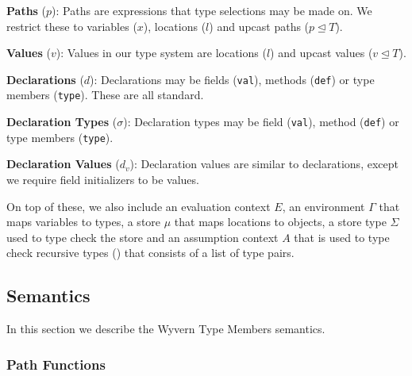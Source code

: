 \documentclass[11pt
              , a4paper
              , twoside
              , openright
              ]{report}
\numberwithin{case}{theorem}
\numberwithin{subcase}{case}
\begin{document}
\textbf{Paths} ($p$): Paths are expressions that type selections may be 
made on. We restrict these to variables ($x$), locations ($l$) and upcast paths ($p \unlhd T$).

\textbf{Values} ($v$): Values in our type system are locations ($l$) and upcast values ($v \unlhd T$). 

\textbf{Declarations} ($d$): Declarations may be fields (\texttt{val}), 
methods (\texttt{def}) or type members (\texttt{type}). These are all
standard.

\textbf{Declaration Types} ($\sigma$): Declaration types may be field 
(\texttt{val}), method (\texttt{def}) or type members (\texttt{type}). 

\textbf{Declaration Values} ($d_v$): Declaration values are similar to 
declarations, except we require field initializers to be values.

On top of these, we also include an evaluation context $E$, an environment 
$\Gamma$ that maps variables to types, a store $\mu$ that maps locations 
to objects, a store type $\Sigma$ used to type check the store and an 
assumption context $A$ that is used to type check recursive types (\cite{Amber Rules etc})
that consists of a list of type pairs.



\subsection{Semantics}
In this section we describe the Wyvern Type Members semantics.
\subsubsection{Path Functions}
\end{document}
